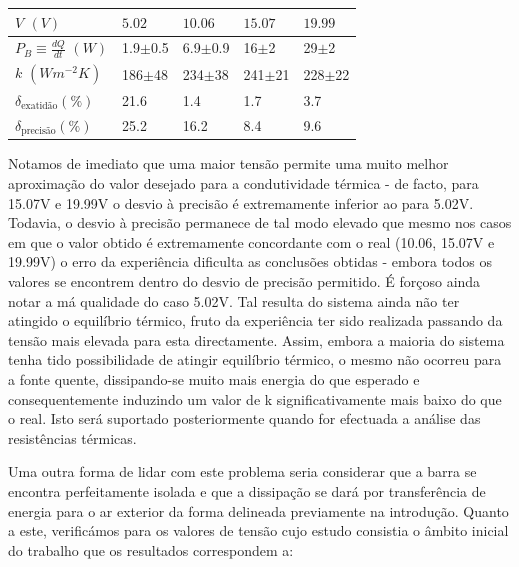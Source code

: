 \documentclass[8pt]{extarticle}
\begin{document}
\begin{multicols}{2}
{\small
\begin{center}
\begin{tabular}{ x{1.9cm} x{1cm} x{1cm} x{1cm} x{1cm} } 
$V$ $(V)$ & $5.02$ & $10.06$ & $15.07$ & $19.99$ \tabularnewline
\hline \hline
$P_B\equiv\frac{dQ}{dt}$ $(W)$ & 1.9$\pm$0.5 & 6.9$\pm$0.9 & 16$\pm$2   & 29$\pm$2 \tabularnewline
$k$ $(Wm^{-2}K)$ & 186$\pm$48  & 234$\pm$38  & 241$\pm$21 & 228$\pm$22 \tabularnewline
$\delta_\text{exatidão} (\%)$ & 21.6 &1.4 & 1.7 & 3.7\tabularnewline
$\delta_\text{precisão} (\%)$ & 25.2 & 16.2 & 8.4 & 9.6\tabularnewline
\end{tabular}
\par{}
\end{center}
}

\par Notamos de imediato que uma maior tensão permite uma muito melhor aproximação do valor desejado para a condutividade térmica - de facto, para 15.07V e 19.99V o desvio à precisão é extremamente inferior ao para 5.02V. Todavia, o desvio à precisão permanece de tal modo elevado que mesmo nos casos em que o valor obtido é extremamente concordante com o real (10.06, 15.07V e 19.99V) o erro da experiência dificulta as conclusões obtidas - embora todos os valores se encontrem dentro do desvio de precisão permitido. É forçoso ainda notar a má qualidade do caso 5.02V. Tal resulta do sistema ainda não ter atingido o equilíbrio térmico, fruto da experiência ter sido realizada passando da tensão mais elevada para esta directamente. Assim, embora a maioria do sistema tenha tido possibilidade de atingir equilíbrio térmico, o mesmo não ocorreu para a fonte quente, dissipando-se muito mais energia do que esperado e consequentemente induzindo um valor de k significativamente mais baixo do que o real. Isto será suportado posteriormente quando for efectuada a análise das resistências térmicas.

\par Uma outra forma de lidar com este problema seria considerar que a barra se encontra perfeitamente isolada e que a dissipação se dará por transferência de energia para o ar exterior da forma delineada previamente na introdução. Quanto a este, verificámos para os valores de tensão cujo estudo consistia o âmbito inicial do trabalho que os resultados correspondem a:


\end{multicols}
\end{document}
